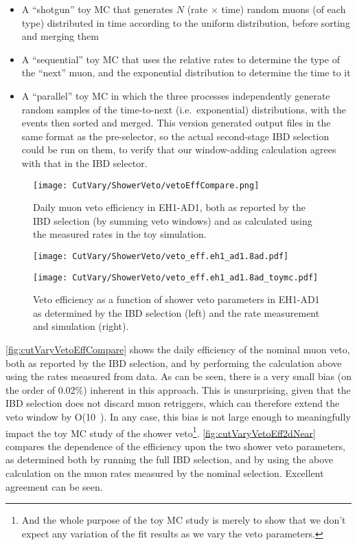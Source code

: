 \documentclass[../thesis.tex]{subfiles}
\begin{document}
\begin{itemize}
\item A ``shotgun'' toy MC that generates $N$ (rate $\times$ time) random muons (of each type) distributed in time according to the uniform distribution, before sorting and merging them
\item A ``sequential'' toy MC that uses the relative rates to determine the type of the ``next'' muon, and the exponential distribution to determine the time to it
\item A ``parallel'' toy MC in which the three processes independently generate random samples of the time-to-next (i.e.\ exponential) distributions, with the events then sorted and merged. This version generated output files in the same format as the pre-selector, so the actual second-stage IBD selection could be run on them, to verify that our window-adding calculation agrees with that in the IBD selector.
\end{itemize}

\begin{figure}[ht]
  \texttt{[image: CutVary/ShowerVeto/vetoEffCompare.png]}
  \caption{Daily muon veto efficiency in EH1-AD1, both as reported by the IBD selection (by summing veto windows) and as calculated using the measured rates in the toy simulation.}
  \label{fig:cutVaryVetoEffCompare}
\end{figure}

\begin{figure}[ht]
  \begin{minipage}{0.5\linewidth}%
    \texttt{[image: CutVary/ShowerVeto/veto\_eff.eh1\_ad1.8ad.pdf]}%
  \end{minipage}%
  \begin{minipage}{0.5\linewidth}%
  \texttt{[image: CutVary/ShowerVeto/veto\_eff.eh1\_ad1.8ad\_toymc.pdf]}%
  \end{minipage}%
  \caption{Veto efficiency as a function of shower veto parameters in EH1-AD1 as determined by the IBD selection (left) and the rate measurement and simulation (right).}
  \label{fig:cutVaryVetoEff2dNear}
\end{figure}

\autoref{fig:cutVaryVetoEffCompare} shows the daily efficiency of the nominal muon veto, both as reported by the IBD selection, and by performing the calculation above using the rates measured from data. As can be seen, there is a very small bias (on the order of 0.02\%) inherent in this approach. This is unsurprising, given that the IBD selection does not discard muon retriggers, which can therefore extend the veto window by O(10~\us). In any case, this bias is not large enough to meaningfully impact the toy MC study of the shower veto\footnote{And the whole purpose of the toy MC study is merely to show that we don't expect any variation of the fit results as we vary the veto parameters.}. \autoref{fig:cutVaryVetoEff2dNear} compares the dependence of the efficiency upon the two shower veto parameters, as determined both by running the full IBD selection, and by using the above calculation on the muon rates measured by the nominal selection. Excellent agreement can be seen.
\end{document}
